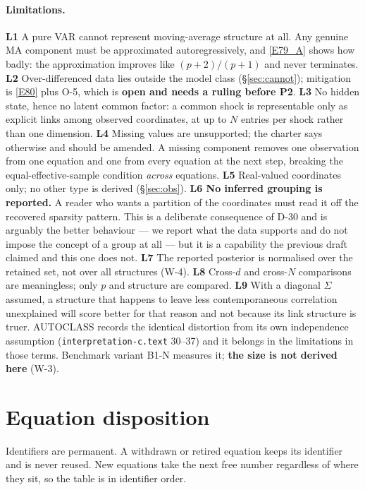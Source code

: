 \paragraph{Limitations.} \textbf{L1} A pure VAR cannot represent moving-average
structure at all. Any genuine MA component must be approximated autoregressively, and
\eqref{E79_A} shows how badly: the approximation improves like $(p+2)/(p+1)$ and never
terminates. \textbf{L2} Over-differenced data lies outside the model class
(\S\ref{sec:cannot}); mitigation is \eqref{E80} plus O-5, which is \textbf{open and
needs a ruling before P2}. \textbf{L3} No hidden state, hence no latent common
factor: a common shock is representable only as explicit links among observed
coordinates, at up to $N$ entries per shock rather than one dimension. \textbf{L4}
Missing values are unsupported; the charter says otherwise and should be amended. A
missing component removes one observation from one equation and one from every
equation at the next step, breaking the equal-effective-sample condition
\emph{across} equations. \textbf{L5} Real-valued coordinates only; no other type is
derived (\S\ref{sec:obs}). \textbf{L6 No inferred grouping is reported.} A reader who
wants a partition of the coordinates must read it off the recovered sparsity pattern.
This is a deliberate consequence of D-30 and is arguably the better behaviour --- we
report what the data supports and do not impose the concept of a group at all --- but
it is a capability the previous draft claimed and this one does not. \textbf{L7} The
reported posterior is normalised over the retained set, not over all structures
(W-4). \textbf{L8} Cross-$d$ and cross-$N$ comparisons are meaningless; only $p$ and
structure are compared. \textbf{L9} With a diagonal $\Sigma$ assumed, a structure
that happens to leave less contemporaneous correlation unexplained will score better
for that reason and not because its link structure is truer. AUTOCLASS records the
identical distortion from its own independence assumption
(\texttt{interpretation-c.text} 30--37) and it belongs in the limitations in those
terms. Benchmark variant B1-N measures it; \textbf{the size is not derived here}
(W-3).


\appendix

\section{Equation disposition}\label{app:disp}

Identifiers are permanent. A withdrawn or retired equation keeps its identifier and
is never reused. New equations take the next free number regardless of where they
sit, so the table is in identifier order.

